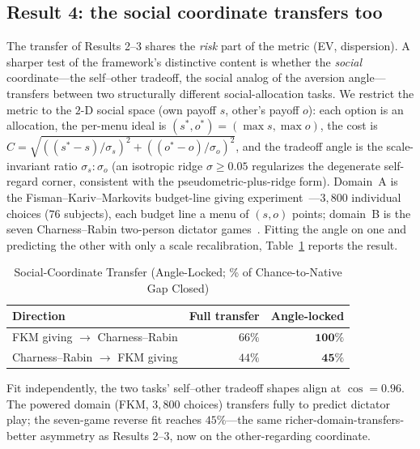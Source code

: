 \documentclass[journal]{IEEEtran}
\begin{document}
\subsection{Result 4: the social coordinate transfers too}
The transfer of Results 2--3 shares the \emph{risk} part of the metric (EV, dispersion).
A sharper test of the framework's distinctive content is whether the \emph{social} coordinate---the self--other tradeoff, the social analog of the aversion angle---transfers between two structurally different social-allocation tasks.
We restrict the metric to the $2$-D social space (own payoff $s$, other's payoff $o$): each option is an allocation, the per-menu ideal is $(s^*,o^*)=(\max s,\max o)$, the cost is $C=\sqrt{((s^*-s)/\sigma_s)^2+((o^*-o)/\sigma_o)^2}$, and the tradeoff angle is the scale-invariant ratio $\sigma_s\!:\!\sigma_o$ (an isotropic ridge $\sigma\geq0.05$ regularizes the degenerate self-regard corner, consistent with the pseudometric-plus-ridge form).
Domain~A is the Fisman--Kariv--Markovits budget-line giving experiment~\cite{fisman2007}---$3{,}800$ individual choices ($76$ subjects), each budget line a menu of $(s,o)$ points; domain~B is the seven Charness--Rabin two-person dictator games~\cite{charness2002}.
Fitting the angle on one and predicting the other with only a scale recalibration, Table~\ref{tab:social} reports the result.

\begin{table}[!t]
\renewcommand{\arraystretch}{1.15}
\caption{Social-Coordinate Transfer (Angle-Locked; \% of Chance-to-Native Gap Closed)}
\label{tab:social}
\centering
\begin{tabular}{l r r}
\toprule
\textbf{Direction} & \textbf{Full transfer} & \textbf{Angle-locked} \\
\midrule
FKM giving $\to$ Charness--Rabin & $66\%$ & $\mathbf{100\%}$ \\
Charness--Rabin $\to$ FKM giving & $44\%$ & $\mathbf{45\%}$ \\
\bottomrule
\end{tabular}
\begin{flushleft}
\footnotesize{Fit independently, the two tasks' self--other tradeoff shapes align at $\cos=0.96$. The powered domain (FKM, $3{,}800$ choices) transfers fully to predict dictator play; the seven-game reverse fit reaches $45\%$---the same richer-domain-transfers-better asymmetry as Results 2--3, now on the other-regarding coordinate.}
\end{flushleft}
\end{table}
\end{document}
